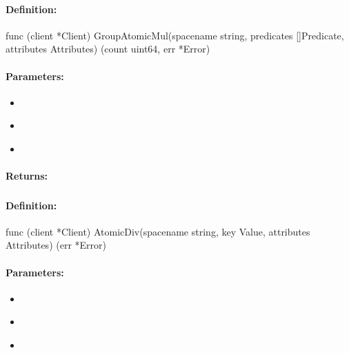 \paragraph{Definition:}
\begin{gocode}
func (client *Client) GroupAtomicMul(spacename string, predicates []Predicate, attributes Attributes) (count uint64, err *Error)
\end{gocode}

\paragraph{Parameters:}
\begin{itemize}[noitemsep]
\item {}\\

\item {}\\

\item {}\\

\end{itemize}

\paragraph{Returns:}


\pagebreak
\subsubsection{}
\label{api:Go:AtomicDiv}


\paragraph{Definition:}
\begin{gocode}
func (client *Client) AtomicDiv(spacename string, key Value, attributes Attributes) (err *Error)
\end{gocode}

\paragraph{Parameters:}
\begin{itemize}[noitemsep]
\item {}\\

\item {}\\

\item {}\\

\end{itemize}

